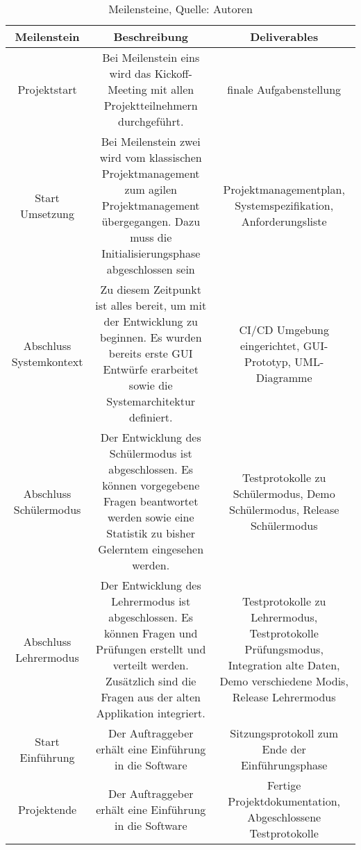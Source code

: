 \documentclass[12pt,titlepage]{article}
\begin{document}
\begin{table}[H]
\setlength\extrarowheight{2pt} %
\begin{tabularx}{\textwidth}{|C|C|C|}
\hline
\textbf{Meilenstein} &  \textbf{Beschreibung} & \textbf{Deliverables}  \\

\hline
Projektstart & Bei Meilenstein eins wird das Kickoff-Meeting mit allen Projektteilnehmern durchgeführt. & finale Aufgabenstellung\\

\hline
Start Umsetzung & Bei Meilenstein zwei wird vom klassischen Projektmanagement zum agilen Projektmanagement übergegangen. Dazu muss die Initialisierungsphase abgeschlossen sein& Projektmanagementplan, Systemspezifikation, Anforderungsliste\\

\hline
Abschluss Systemkontext & Zu diesem Zeitpunkt ist alles bereit, um mit der Entwicklung zu beginnen. Es wurden bereits erste GUI Entwürfe erarbeitet sowie die Systemarchitektur definiert.  & CI/CD Umgebung eingerichtet, GUI-Prototyp, UML-Diagramme  \\

\hline
Abschluss Schülermodus & Der Entwicklung des Schülermodus ist abgeschlossen. Es können vorgegebene Fragen beantwortet werden sowie eine Statistik zu bisher Gelerntem eingesehen werden.  & Testprotokolle zu Schülermodus, Demo Schülermodus, Release Schülermodus  \\

\hline
Abschluss Lehrermodus & Der Entwicklung des Lehrermodus ist abgeschlossen. Es können Fragen und Prüfungen erstellt und verteilt werden. Zusätzlich sind die Fragen aus der alten Applikation integriert. & Testprotokolle zu Lehrermodus, Testprotokolle Prüfungsmodus, Integration alte Daten, Demo verschiedene Modis, Release Lehrermodus  \\

\hline
Start Einführung & Der Auftraggeber erhält eine Einführung in die Software & Sitzungsprotokoll zum Ende der Einführungsphase  \\

\hline
Projektende & Der Auftraggeber erhält eine Einführung in die Software & Fertige Projektdokumentation, Abgeschlossene Testprotokolle   \\
\hline
\end{tabularx}
\caption{ \label{tbl: Meilensteine}Meilensteine, Quelle: Autoren}
\end{table}
\end{document}
